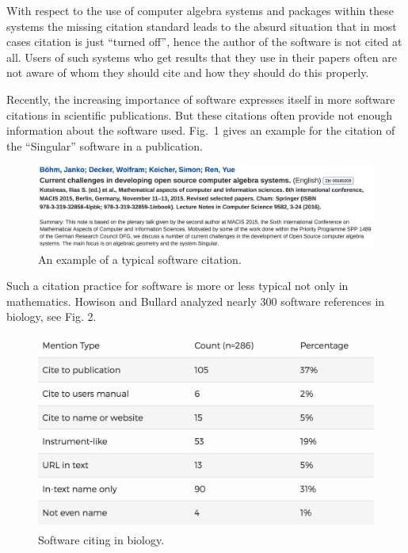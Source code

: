 \documentclass[12pt]{article}
\begin{document}
With respect to the use of computer algebra systems and packages within these systems the missing citation standard leads to the absurd situation that in most cases citation is just ``turned off'', hence the author of the software is not cited at all. Users of such systems who get results that they use in their papers often are not aware of whom they should cite and how they should do this properly.

Recently, the increasing importance of software expresses itself in more software citations in scientific publications. But these citations often provide not enough information about the software used.  Fig.~1 gives an example for the citation of the ``Singular'' software in a publication.

\begin{figure}[h]
 \centering
 \includegraphics[scale=0.15]{aca1}
 \caption{An example of a typical software citation.\label{abb_1}}
\end{figure}

Such a citation practice for software is more or less typical not only in mathematics. Howison and Bullard \cite{Howison&Bullard2015} analyzed nearly 300 software references in biology, see Fig. 2.

\begin{figure}[h]
 \centering
 \includegraphics[scale=0.15]{aca2}
 \caption{Software citing in biology.\label{abb_2}}
\end{figure}
\end{document}
